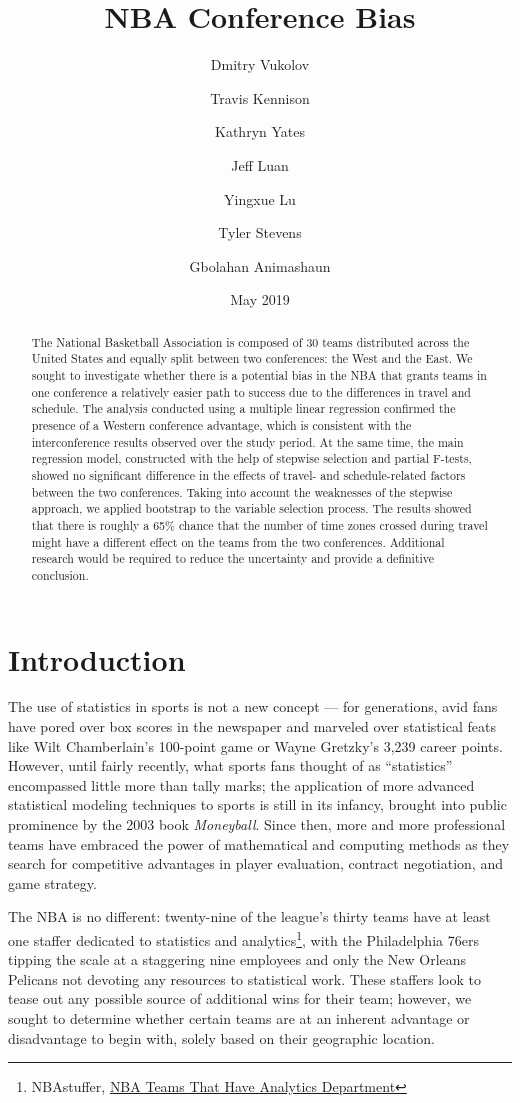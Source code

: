 \documentclass[
    12pt,
    a4paper,
    titlepage,  %
    abstract,  %
    headings=standardclasses,  %
    bibliography=totocnumbered  %
]{scrartcl}
\title{NBA Conference Bias}
\author{
    Dmitry Vukolov \and
    Travis Kennison \and
    Kathryn Yates \and
    Jeff Luan \and
    Yingxue Lu \and
    Tyler Stevens \and
    Gbolahan Animashaun
    }
\date{May 2019}
\begin{document}
\maketitle

\begin{abstract}
The National Basketball Association is composed of 30 teams distributed across the United States and equally split between two conferences: the West and the East. We sought to investigate whether there is a potential bias in the NBA that grants teams in one conference a relatively easier path to success due to the differences in travel and schedule. The analysis conducted using a multiple linear regression confirmed the presence of a Western conference advantage, which is consistent with the interconference results observed over the study period. At the same time, the main regression model, constructed with the help of stepwise selection and partial F-tests, showed no significant difference in the effects of travel- and schedule-related factors between the two conferences. Taking into account the weaknesses of the stepwise approach, we applied bootstrap to the variable selection process. The results showed that there is roughly a 65\% chance that the number of time zones crossed during travel might have a different effect on the teams from the two conferences. Additional research would be required to reduce the uncertainty and provide a definitive conclusion.
\end{abstract}

\newpage
\tableofcontents
\newpage

\section{Introduction}
The use of statistics in sports is not a new concept — for generations, avid fans have pored over box scores in the newspaper and marveled over statistical feats like Wilt Chamberlain's 100-point game or Wayne Gretzky's 3,239 career points. However, until fairly recently, what sports fans thought of as ``statistics'' encompassed little more than tally marks; the application of more advanced statistical modeling techniques to sports is still in its infancy, brought into public prominence by the 2003 book \emph{Moneyball}. Since then, more and more professional teams have embraced the power of mathematical and computing methods as they search for competitive advantages in player evaluation, contract negotiation, and game strategy.

The NBA is no different: twenty-nine of the league's thirty teams have at least one staffer dedicated to statistics and analytics\footnote{NBAstuffer, \href{https://www.nbastuffer.com/analytics101/nba-teams-that-have-analytics-department/}{NBA Teams That Have Analytics Department}}, with the Philadelphia 76ers tipping the scale at a staggering nine employees and only the New Orleans Pelicans not devoting any resources to statistical work. These staffers look to tease out any possible source of additional wins for their team; however, we sought to determine whether certain teams are at an inherent advantage or disadvantage to begin with, solely based on their geographic location.
\end{document}
